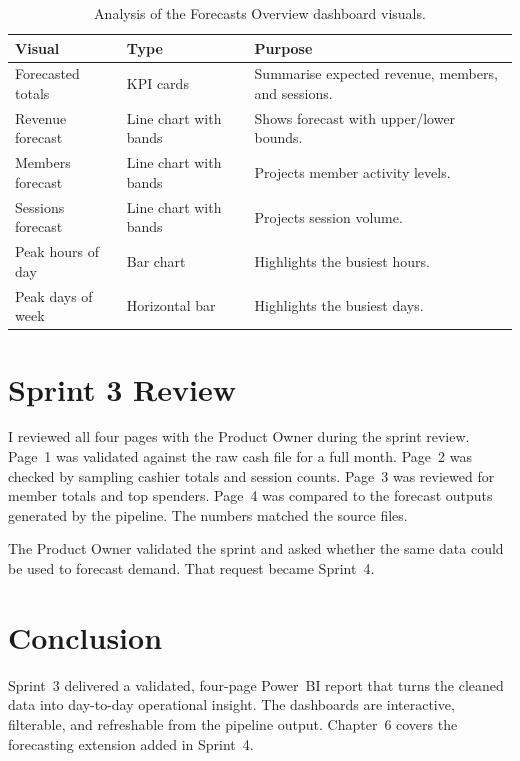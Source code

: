 \documentclass[12pt, a4paper]{report}
\begin{document}
\begin{table}[H]
  \centering
  \caption{Analysis of the Forecasts Overview dashboard visuals.\label{tab:shift_analysis}}
  \begin{tabular}{p{3.5cm} p{2.5cm} p{7cm}}
    \toprule
    \textbf{Visual} & \textbf{Type} & \textbf{Purpose} \\
    \midrule
    Forecasted totals
      & KPI cards
      & Summarise expected revenue, members, and sessions. \\[4pt]
    Revenue forecast
      & Line chart with bands
      & Shows forecast with upper/lower bounds. \\[4pt]
    Members forecast
      & Line chart with bands
      & Projects member activity levels. \\[4pt]
    Sessions forecast
      & Line chart with bands
      & Projects session volume. \\[4pt]
    Peak hours of day
      & Bar chart
      & Highlights the busiest hours. \\[4pt]
    Peak days of week
      & Horizontal bar
      & Highlights the busiest days. \\
    \bottomrule
  \end{tabular}
\end{table}

\section{Sprint 3 Review}

I reviewed all four pages with the Product Owner during the sprint review. Page~1
was validated against the raw cash file for a full month. Page~2 was checked by
sampling cashier totals and session counts. Page~3 was reviewed for member totals
and top spenders. Page~4 was compared to the forecast outputs generated by the
pipeline. The numbers matched the source files.

The Product Owner validated the sprint and asked whether the same data could be
used to forecast demand. That request became Sprint~4.

\section{Conclusion}

Sprint~3 delivered a validated, four-page Power~BI report that turns the cleaned
data into day-to-day operational insight. The dashboards are interactive, filterable,
and refreshable from the pipeline output. Chapter~6 covers the forecasting extension
added in Sprint~4.
\end{document}
